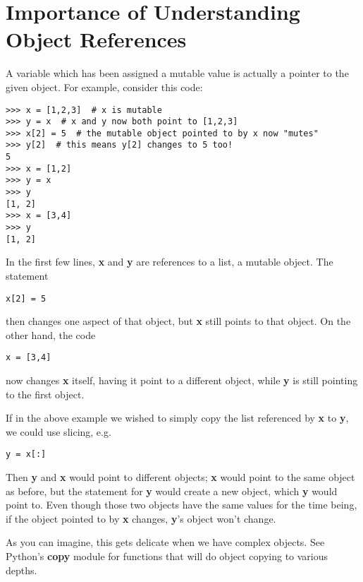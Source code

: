 \section{Importance of Understanding Object References}
\label{effects}

A variable which has been assigned a mutable value is actually a pointer
to the given object.  For example, consider this code:

\begin{Verbatim}[fontsize=\relsize{-2}]
>>> x = [1,2,3]  # x is mutable
>>> y = x  # x and y now both point to [1,2,3]
>>> x[2] = 5  # the mutable object pointed to by x now "mutes"
>>> y[2]  # this means y[2] changes to 5 too!
5
>>> x = [1,2]
>>> y = x
>>> y
[1, 2]
>>> x = [3,4]
>>> y
[1, 2]
\end{Verbatim}  

In the first few lines, {\bf x} and {\bf y} are references to a list,
a mutable object.  The statement

\begin{Verbatim}[fontsize=\relsize{-2}]
x[2] = 5
\end{Verbatim}

then changes one aspect of that object, but {\bf x} still points to that
object.  On the other hand, the code

\begin{Verbatim}[fontsize=\relsize{-2}]
x = [3,4]
\end{Verbatim}

now changes {\bf x} itself, having it point to a different object, while
{\bf y} is still pointing to the first object.

If in the above example we wished to simply copy the list referenced by
{\bf x} to {\bf y}, we could use slicing, e.g.

\begin{Verbatim}[fontsize=\relsize{-2}]
y = x[:]
\end{Verbatim}

Then {\bf y} and {\bf x} would point to different objects; {\bf x} would
point to the same object as before, but the statement for {\bf y} would
create a new object, which {\bf y} would point to.  Even though those
two objects have the same values for the time being, if the object
pointed to by {\bf x} changes, {\bf y}'s object won't change.

As you can imagine, this gets delicate when we have complex objects.
See Python's {\bf copy} module for functions that will do object copying
to various depths.

